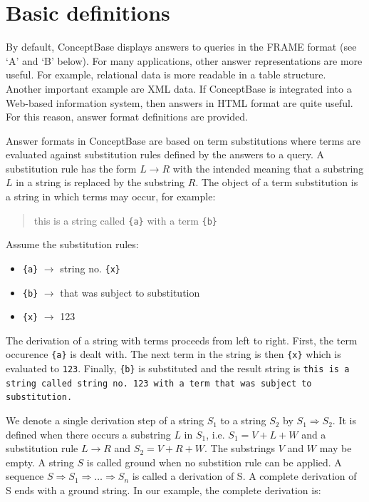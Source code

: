 \section{Basic definitions}

By default, ConceptBase displays answers to queries in the FRAME format (see `A' and `B' below). For many applications, other answer
representations are more useful. For example, relational data is more readable in a table structure. Another important example are XML data. If
ConceptBase is integrated into a Web-based information system, then answers in HTML format are quite useful. For this reason, answer format
definitions are provided.

Answer formats in ConceptBase are based on term substitutions where terms are evaluated against substitution rules defined by the answers to
a query. A substitution rule has the form $L \longrightarrow R$ with the intended meaning that a substring $L$ in a string is replaced by the substring $R$. The
object of a term substitution is a string in which terms may occur, for example:

\begin{quotation}
    this is a string called \verb+{a}+ with a term \verb+{b}+
\end{quotation}

Assume the substitution rules:

\begin{itemize}
\item \verb+{a}+ $\longrightarrow$ string no. \verb+{x}+
\item \verb+{b}+ $\longrightarrow$ that was subject to substitution
\item \verb+{x}+ $\longrightarrow$ 123
\end{itemize}

The derivation of a string with terms proceeds from left to right. First, the term occurence \verb+{a}+ is dealt with. The next term in the string is then \verb+{x}+
which is evaluated to \verb+123+. Finally, \verb+{b}+ is substituted and the result string is
{\tt this is a string called string no.\ 123 with a term that was subject to substitution.}

We denote a single derivation step of a string $S_1$ to a string $S_2$ by $S_1 \Longrightarrow S_2$. It is defined when there occurs a substring $L$ in $S_1$, i.e.
$S_1=V+L+W$ and a substitution rule $ L \longrightarrow R$ and $S_2=V+R+W$. The substrings $V$ and $W$ may be empty. A string $S$ is called ground when no
substition rule can be applied. A sequence $ S \Longrightarrow S_1 \Longrightarrow \ldots \Longrightarrow S_n$ is called a derivation of S. A complete derivation of S ends with a
ground string. In our example, the complete derivation is:


